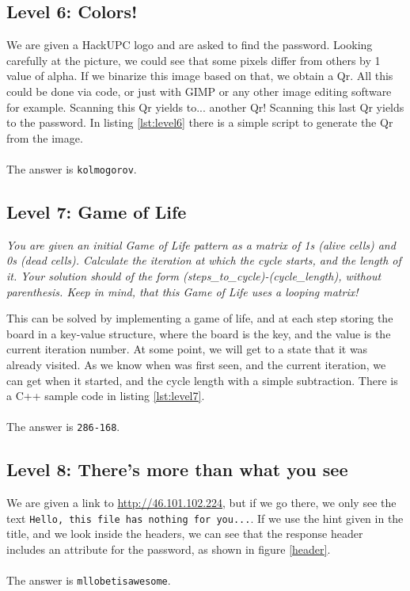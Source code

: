 \documentclass[paper=a4, fontsize=11pt]{scrartcl}	%
\begin{document}
\subsection*{Level 6: Colors!}
We are given a HackUPC logo and are asked to find the password. Looking carefully at the picture, we could see that some pixels differ from others by 1 value of alpha. If we binarize this image based on that, we obtain a Qr. All this could be done via code, or just with GIMP or any other image editing software for example. Scanning this Qr yields to... another Qr! Scanning this last Qr yields to the password. In listing \ref{lst:level6} there is a simple script to generate the Qr from the image.
\\
\\
The answer is \texttt{kolmogorov}.





\subsection*{Level 7: Game of Life}
\textit{You are given an initial Game of Life pattern as a matrix of 1s (alive cells) and 0s (dead cells). Calculate the iteration at which the cycle starts, and the length of it. Your solution should of the form (steps\_to\_cycle)-(cycle\_length), without parenthesis. Keep in mind, that this Game of Life uses a looping matrix!}

This can be solved by implementing a game of life, and at each step storing the board in a key-value structure, where the board is the key, and the value is the current iteration number. At some point, we will get to a state that it was already visited. As we know when was first seen, and the current iteration, we can get when it started, and the cycle length with a simple subtraction. There is a C++ sample code in listing \ref{lst:level7}.
\\
\\
The answer is \texttt{286-168}.






\subsection*{Level 8: There's more than what you see}
We are given a link to \url{http://46.101.102.224}, but if we go there, we only see the text \texttt{Hello, this file has nothing for you...}. If we use the hint given in the title, and we look inside the headers, we can see that the response header includes an attribute for the password, as shown in figure \ref{header}.
\\
\\
The answer is \texttt{mllobetisawesome}.
\end{document}
